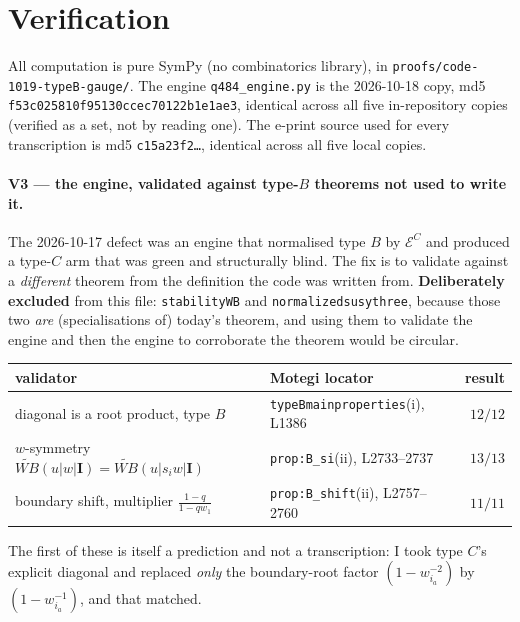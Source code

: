 \documentclass[11pt]{article}
\theoremstyle{definition}
\newcommand{\bI}{\mathbf{I}}
\newcommand{\EC}{\mathcal{E}^{C}}
\begin{document}
\section{Verification}
\label{sec:verif}

All computation is pure SymPy (no combinatorics library), in
\texttt{proofs/code-1019-typeB-gauge/}.  The engine
\texttt{q484\_engine.py} is the 2026-10-18 copy, md5
\texttt{f53c025810f95130ccec70122b1e1ae3}, identical across all five
in-repository copies (verified as a set, not by reading one).  The e-print
source used for every transcription is md5 \texttt{c15a23f2\dots}, identical
across all five local copies.

\paragraph{V3 --- the engine, validated against type-$B$ theorems not used to
write it.}  The 2026-10-17 defect was an engine that normalised type $B$ by
$\EC$ and produced a type-$C$ arm that was green and structurally blind.  The
fix is to validate against a \emph{different} theorem from the definition the
code was written from.  \textbf{Deliberately excluded} from this file:
\texttt{stabilityWB} and \texttt{normalizedsusythree}, because those two
\emph{are} (specialisations of) today's theorem, and using them to validate the
engine and then the engine to corroborate the theorem would be circular.
\begin{center}
\begin{tabular}{@{}llr@{}}
\toprule
validator & Motegi locator & result\\
\midrule
diagonal is a root product, type $B$ & \texttt{typeBmainproperties}(i), L1386 & $12/12$\\
$w$-symmetry $\widetilde{WB}(u|w|\bI)=\widetilde{WB}(u|s_iw|\bI)$
  & \texttt{prop:B\_si}(ii), L2733--2737 & $13/13$\\
boundary shift, multiplier $\frac{1-q}{1-qw_1}$
  & \texttt{prop:B\_shift}(ii), L2757--2760 & $11/11$\\
\bottomrule
\end{tabular}
\end{center}
The first of these is itself a prediction and not a transcription: I took type
$C$'s explicit diagonal and replaced \emph{only} the boundary-root factor
$(1-w_{i_a}^{-2})$ by $(1-w_{i_a}^{-1})$, and that matched.
\end{document}
